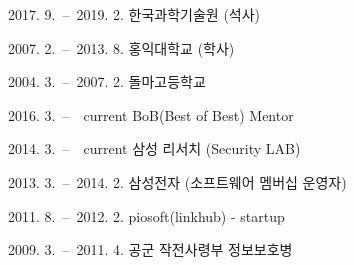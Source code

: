 \curriculumvitae[4]
		\begin{personaldata}
		 \end{personaldata}

		\begin{education}
				\item[2017. 9.\ --\ 2019. 2.] 한국과학기술원 (석사)
				\item[2007. 2.\ --\ 2013. 8.] 홍익대학교 (학사)
				\item[2004. 3.\ --\ 2007. 2.] 돌마고등학교
				
		\end{education}

		\begin{career}
				\item[2016. 3.\ --\ ~current] BoB(Best of Best) Mentor
				\item[2014. 3.\ --\ ~current] 삼성 리서치 (Security LAB)
				\item[2013. 3.\ --\ 2014. 2.] 삼성전자 (소프트웨어 멤버십 운영자) 
				\item[2011. 8.\ --\ 2012. 2.] piosoft(linkhub) - startup
				\item[2009. 3.\ --\ 2011. 4.] 공군 작전사령부 정보보호병
		\end{career}

